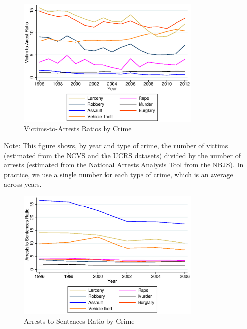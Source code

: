 \documentclass[static]{JJH-Beamer}
\begin{document}
\begin{frame}
 \addtocounter{framenumber}{-1}

\begin{figure} [H]
\caption{Victims-to-Arrests Ratios by Crime}\label{fig:victim1}
\begin{center}
\includegraphics[width=0.8\textwidth]{AppOutput/Crime/v-to-a-ratios}
\end{center}
\end{figure}

\end{frame}

{\flushleft \normalsize Note: This figure shows, by year and type of crime, the number of victims (estimated from the NCVS and the UCRS datasets) divided by the number of arrests (estimated from the National Arrests Analysis Tool from the NBJS). In practice, we use a single number for each type of crime, which is an average across years.\\}

\begin{frame}
 \addtocounter{framenumber}{-1}

\begin{figure} [H]
\caption{Arrests-to-Sentences Ratio by Crime}\label{fig:victim2}
\begin{center}
\includegraphics[width=0.8\textwidth]{AppOutput/Crime/a-to-s-ratios}
\end{center}
\end{figure}

\end{frame}
\end{document}
